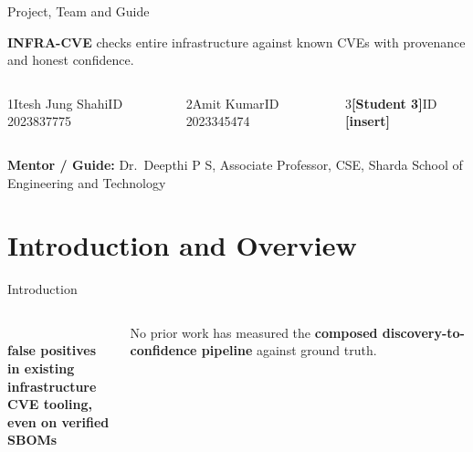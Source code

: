 \documentclass[aspectratio=169,12pt]{beamer}
\newlength{\ch}\setlength{\ch}{47mm}
\newcommand{\ph}[1]{\textcolor{accent}{\textbf{[#1]}}}
\begin{document}
\begin{frame}{Project, Team and Guide}
\begin{stmt}[height={14mm},height plus=30mm,fontupper=\normalsize]\textbf{INFRA-CVE} checks entire infrastructure against known CVEs with provenance and honest confidence.\end{stmt}
\vskip2mm\setlength{\ch}{20mm}
\begin{columns}[T,onlytextwidth]
\begin{tc}{1}{\normalsize Itesh Jung Shahi}\small ID 2023837775\end{tc}
\begin{tc}{2}{\normalsize Amit Kumar}\small ID 2023345474\end{tc}
\begin{tc}{3}{\normalsize\ph{Student 3}}\small ID \ph{insert}\end{tc}
\end{columns}\vskip1.5mm
\begin{wc}[borderline west={1.6mm}{0pt}{teal}]\small\textbf{Mentor / Guide:} Dr.\ Deepthi P S, Associate Professor, CSE, Sharda School of Engineering and Technology\end{wc}
\end{frame}

\section{Introduction and Overview}
\begin{frame}{Introduction}
\begin{columns}[c,onlytextwidth]
\\[1mm]{\bfseries false positives in existing\\infrastructure CVE tooling,\\even on verified SBOMs}
\begin{stmt}[height={46mm},height plus=30mm,fontupper=\fontsize{14}{20}\selectfont]No prior work has measured the \textbf{composed discovery-to-confidence pipeline} against ground truth.\end{stmt}
\end{columns}
\end{frame}
\end{document}
